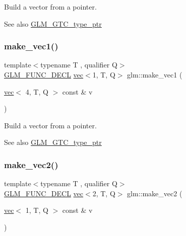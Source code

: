 Build a vector from a pointer. \begin{DoxySeeAlso}{See also}
\hyperlink{group__gtc__type__ptr}{G\+L\+M\+\_\+\+G\+T\+C\+\_\+type\+\_\+ptr} 
\end{DoxySeeAlso}
\mbox{\label{group__gtc__type__ptr_ga6af06bb60d64ca8bcd169e3c93bc2419}} 
\subsubsection{\texorpdfstring{make\+\_\+vec1()}{make\_vec1()}\hspace{0.1cm}{\footnotesize\ttfamily [4/4]}}
{\footnotesize\ttfamily template$<$typename T , qualifier Q$>$ \\
\hyperlink{setup_8hpp_ab2d052de21a70539923e9bcbf6e83a51}{G\+L\+M\+\_\+\+F\+U\+N\+C\+\_\+\+D\+E\+CL} \hyperlink{structglm_1_1vec}{vec}$<$1, T, Q$>$ glm\+::make\+\_\+vec1 (\begin{DoxyParamCaption}\item[{\hyperlink{structglm_1_1vec}{vec}$<$ 4, T, Q $>$ const \&}]{v }\end{DoxyParamCaption})\hspace{0.3cm}{\ttfamily [inline]}}

Build a vector from a pointer. \begin{DoxySeeAlso}{See also}
\hyperlink{group__gtc__type__ptr}{G\+L\+M\+\_\+\+G\+T\+C\+\_\+type\+\_\+ptr} 
\end{DoxySeeAlso}
\mbox{\label{group__gtc__type__ptr_ga8476d0e6f1b9b4a6193cc25f59d8a896}} 
\subsubsection{\texorpdfstring{make\+\_\+vec2()}{make\_vec2()}\hspace{0.1cm}{\footnotesize\ttfamily [1/5]}}
{\footnotesize\ttfamily template$<$typename T , qualifier Q$>$ \\
\hyperlink{setup_8hpp_ab2d052de21a70539923e9bcbf6e83a51}{G\+L\+M\+\_\+\+F\+U\+N\+C\+\_\+\+D\+E\+CL} \hyperlink{structglm_1_1vec}{vec}$<$2, T, Q$>$ glm\+::make\+\_\+vec2 (\begin{DoxyParamCaption}\item[{\hyperlink{structglm_1_1vec}{vec}$<$ 1, T, Q $>$ const \&}]{v }\end{DoxyParamCaption})\hspace{0.3cm}{\ttfamily [inline]}}

